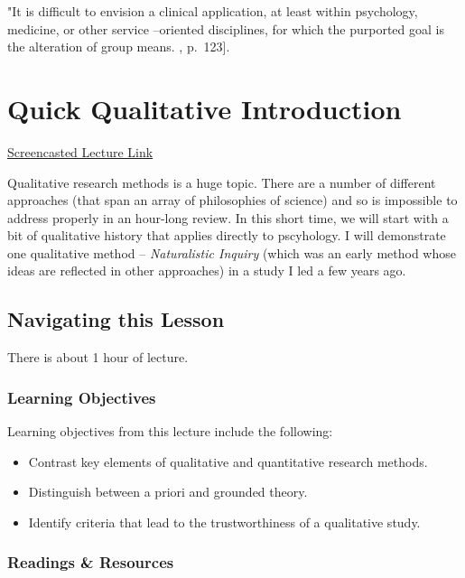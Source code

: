 \documentclass[
  english,
]{book}
\providecommand{\tightlist}{%
  \setlength{\itemsep}{0pt}\setlength{\parskip}{0pt}}
\begin{document}
"It is difficult to envision a clinical application, at least within psychology, medicine, or other service --oriented disciplines, for which the purported goal is the alteration of group means. \citeyearpar{morgan_single-participant_2001}, p.~123{]}.

\hypertarget{Qualitative}{%
\chapter{Quick Qualitative Introduction}\label{Qualitative}}

\href{https://spu.hosted.panopto.com/Panopto/Pages/Viewer.aspx?pid=fe82fd33-43da-4ad6-afeb-aad2016db360}{Screencasted Lecture Link}

Qualitative research methods is a huge topic. There are a number of different approaches (that span an array of philosophies of science) and so is impossible to address properly in an hour-long review. In this short time, we will start with a bit of qualitative history that applies directly to pscyhology. I will demonstrate one qualitative method -- \emph{Naturalistic Inquiry} (which was an early method whose ideas are reflected in other approaches) in a study I led a few years ago.

\hypertarget{navigating-this-lesson-4}{%
\section{Navigating this Lesson}\label{navigating-this-lesson-4}}

There is about 1 hour of lecture.

\hypertarget{learning-objectives-4}{%
\subsection{Learning Objectives}\label{learning-objectives-4}}

Learning objectives from this lecture include the following:

\begin{itemize}
\tightlist
\item
  Contrast key elements of qualitative and quantitative research methods.
\item
  Distinguish between a priori and grounded theory.
\item
  Identify criteria that lead to the trustworthiness of a qualitative study.
\end{itemize}

\hypertarget{readings-resources-4}{%
\subsection{Readings \& Resources}\label{readings-resources-4}}
\end{document}
